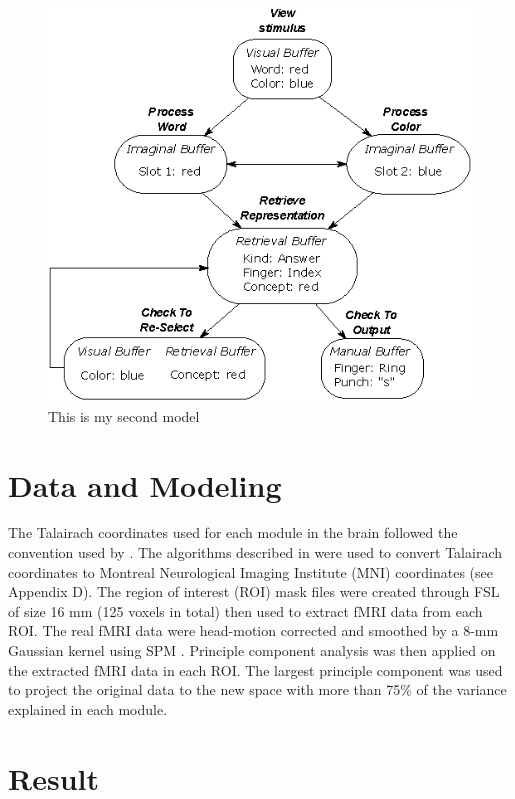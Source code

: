\documentclass[10pt,letterpaper]{article}
\begin{document}
\begin{figure}[ht]
\centering
  \includegraphics[width=\linewidth]{overall_model.eps}
  \caption{This is my second model}
\end{figure}%


\section{Data and Modeling}

The Talairach coordinates used for each module in the brain followed the convention used by \cite{Anderson2008, Borst2017}. The algorithms described in \cite{Lacadie2008} were used to convert Talairach coordinates to Montreal Neurological Imaging Institute (MNI) coordinates (see Appendix D). The region of interest (ROI) mask files were created through FSL \cite{Woolrich2009} of size 16 mm (125 voxels in total) then used to extract fMRI data from each ROI. The real fMRI data were head-motion corrected and smoothed by a 8-mm Gaussian kernel using SPM \cite{Penny2006}. Principle component analysis was then applied on the extracted fMRI data in each ROI. The largest principle component was used to project the original data to the new space with more than 75\% of the variance explained in each module.



\section{Result}
\end{document}
